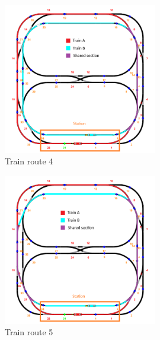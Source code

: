 \documentclass{article}
\begin{document}
        \begin{figure}[!htb]
        \centering
        \includegraphics[width=0.6\textwidth]{./doc/assets/Route_4}
        \caption{Train route 4}
    \end{figure}
        \begin{figure}[!htb]
        \centering
        \includegraphics[width=0.6\textwidth]{./doc/assets/Route_5}
        \caption{Train route 5}
    \end{figure}
\end{document}
